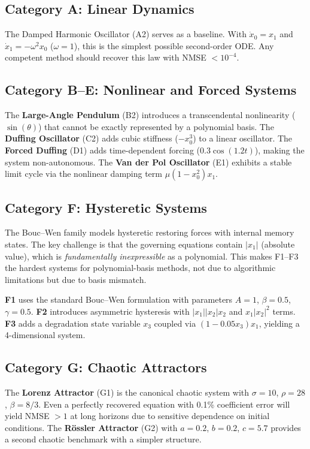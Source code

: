 \documentclass[conference]{IEEEtran}
\begin{document}
\subsection{Category A: Linear Dynamics}
The Damped Harmonic Oscillator (A2) serves as a baseline. With $\dot{x}_0 = x_1$ and $\dot{x}_1 = -\omega^2 x_0$ ($\omega = 1$), this is the simplest possible second-order ODE. Any competent method should recover this law with NMSE $< 10^{-4}$.

\subsection{Category B--E: Nonlinear and Forced Systems}
The \textbf{Large-Angle Pendulum} (B2) introduces a transcendental nonlinearity ($\sin(\theta)$) that cannot be exactly represented by a polynomial basis. The \textbf{Duffing Oscillator} (C2) adds cubic stiffness ($-x_0^3$) to a linear oscillator. The \textbf{Forced Duffing} (D1) adds time-dependent forcing ($0.3\cos(1.2t)$), making the system non-autonomous. The \textbf{Van der Pol Oscillator} (E1) exhibits a stable limit cycle via the nonlinear damping term $\mu(1 - x_0^2)x_1$.

\subsection{Category F: Hysteretic Systems}
The Bouc--Wen family \cite{boucwen1976} models hysteretic restoring forces with internal memory states. The key challenge is that the governing equations contain $|x_1|$ (absolute value), which is \textit{fundamentally inexpressible} as a polynomial. This makes F1--F3 the hardest systems for polynomial-basis methods, not due to algorithmic limitations but due to basis mismatch.

\textbf{F1} uses the standard Bouc--Wen formulation with parameters $A = 1$, $\beta = 0.5$, $\gamma = 0.5$. \textbf{F2} introduces asymmetric hysteresis with $|x_1||x_2|x_2$ and $x_1|x_2|^2$ terms. \textbf{F3} adds a degradation state variable $x_3$ coupled via $(1 - 0.05 x_3)x_1$, yielding a 4-dimensional system.

\subsection{Category G: Chaotic Attractors}
The \textbf{Lorenz Attractor} (G1) \cite{lorenz1963} is the canonical chaotic system with $\sigma = 10$, $\rho = 28$, $\beta = 8/3$. Even a perfectly recovered equation with 0.1\% coefficient error will yield NMSE $> 1$ at long horizons due to sensitive dependence on initial conditions. The \textbf{R\"{o}ssler Attractor} (G2) \cite{rossler1976} with $a = 0.2$, $b = 0.2$, $c = 5.7$ provides a second chaotic benchmark with a simpler structure.
\end{document}
